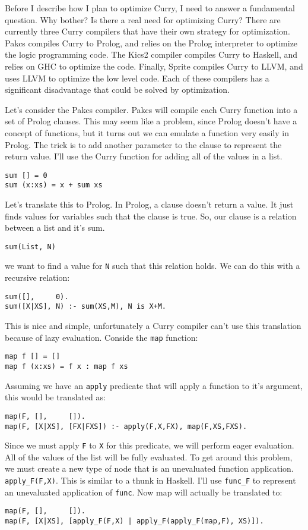 
Before I describe how I plan to optimize Curry, I need to answer a fundamental question.
Why bother?
Is there a real need for optimizing Curry?
There are currently three Curry compilers that have their own strategy for optimization.
Pakcs compiles Curry to Prolog, and relies on the Prolog interpreter to optimize the logic programming code.
The Kics2 compiler compiles Curry to Haskell, and relies on GHC to optimize the code.
Finally, Sprite compiles Curry to LLVM, and uses LLVM to optimize the low level code.
Each of these compilers has a significant disadvantage that could be solved by optimization.

Let's consider the Pakcs compiler.
Pakcs will compile each Curry function into a set of Prolog clauses.
This may seem like a problem, since Prolog doesn't have a concept of functions,
but it turns out we can emulate a function very easily in Prolog.
The trick is to add another parameter to the clause to represent the return value.
I'll use the Curry function for adding all of the values in a list.

\begin{verbatim}
sum [] = 0
sum (x:xs) = x + sum xs
\end{verbatim}

Let's translate this to Prolog.
In Prolog, a clause doesn't return a value.
It just finds values for variables such that the clause is true.
So, our clause is a relation between a list and it's sum.
\begin{verbatim}
sum(List, N)
\end{verbatim}
we want to find a value for \texttt{N} such that this relation holds.
We can do this with a recursive relation:
\begin{verbatim}
sum([],     0).
sum([X|XS], N) :- sum(XS,M), N is X+M.
\end{verbatim}

This is nice and simple, unfortunately a Curry compiler can't use this translation
because of lazy evaluation.
Conside the \texttt{map} function:
\begin{verbatim}
map f [] = []
map f (x:xs) = f x : map f xs
\end{verbatim}
Assuming we have an \texttt{apply} predicate that will apply a function to it's argument,
this would be translated as:
\begin{verbatim}
map(F, [],     []).
map(F, [X|XS], [FX|FXS]) :- apply(F,X,FX), map(F,XS,FXS).
\end{verbatim}

Since we must apply \texttt F to \texttt X for this predicate, we will perform eager evaluation.
All of the values of the list will be fully evaluated.
To get around this problem, we must create a new type of node that is an unevaluated function application.
\texttt{apply\_F(F,X)}.
This is similar to a thunk in Haskell.
I'll use \texttt{func\_F} to represent an unevaluated application of \texttt{func}.
Now map will actually be translated to:
\begin{verbatim}
map(F, [],     []).
map(F, [X|XS], [apply_F(F,X) | apply_F(apply_F(map,F), XS)]).
\end{verbatim}

